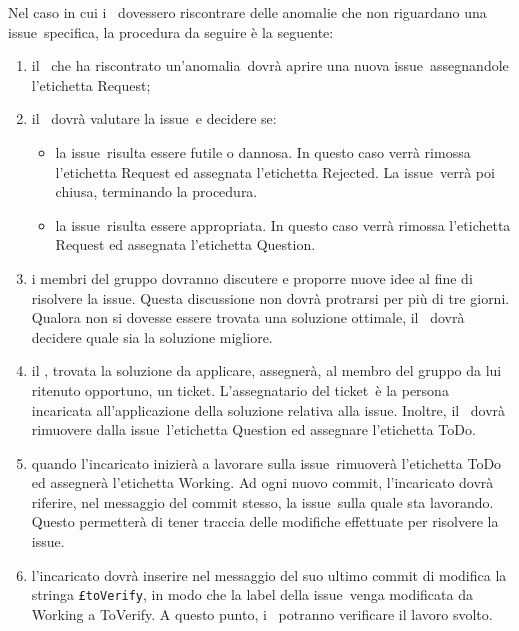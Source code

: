 \documentclass[../NormeProgetto.text]{subfiles}
\begin{document}
				Nel caso in cui i \verificatori\ dovessero riscontrare delle anomalie che non riguardano una issue\g\ specifica, la procedura da seguire è la seguente:
					\begin{enumerate}
						\item il \verificatore\ che ha riscontrato un'anomalia\g\ dovrà aprire una nuova issue\g\ assegnandole l'etichetta Request;
						\item il \responsabilediprogetto\ dovrà valutare la issue\g\ e decidere se:			\begin{itemize}
							\item la issue\g\ risulta essere futile o dannosa. In questo caso verrà rimossa l'etichetta Request ed assegnata l'etichetta Rejected. La issue\g\ verrà poi chiusa, terminando la procedura.
							\item la issue\g\ risulta essere appropriata. In questo caso verrà rimossa l'etichetta Request ed assegnata l'etichetta Question. 
						\end{itemize}
						\item i membri del gruppo dovranno discutere e proporre nuove idee al fine di risolvere la issue\g. Questa discussione non dovrà protrarsi per più di tre giorni. Qualora non si dovesse essere trovata una soluzione ottimale, il \responsabilediprogetto\ dovrà decidere quale sia la soluzione migliore.
						\item il \responsabilediprogetto, trovata la soluzione da applicare,  assegnerà, al membro del gruppo da lui ritenuto opportuno, un ticket\g. L'assegnatario del ticket\g\ è la persona incaricata all'applicazione della soluzione relativa alla issue\g. Inoltre, il \responsabilediprogetto\ dovrà rimuovere dalla issue\g\ l'etichetta Question ed assegnare l'etichetta ToDo.
						\item quando l'incaricato inizierà a lavorare sulla issue\g\ rimuoverà l'etichetta ToDo ed assegnerà l'etichetta Working. Ad ogni nuovo commit, l'incaricato dovrà riferire, nel messaggio del commit stesso, la issue\g\ sulla quale sta lavorando. Questo permetterà di tener traccia delle modifiche effettuate per risolvere la issue\g.
						\item l'incaricato dovrà inserire nel messaggio del suo ultimo commit di modifica la stringa \texttt{£toVerify}, in modo che la label della issue\g\ venga modificata da Working a ToVerify. A questo punto, i \verificatori\ potranno verificare il lavoro svolto.
					\end{enumerate}					
\newpage
\end{document}
